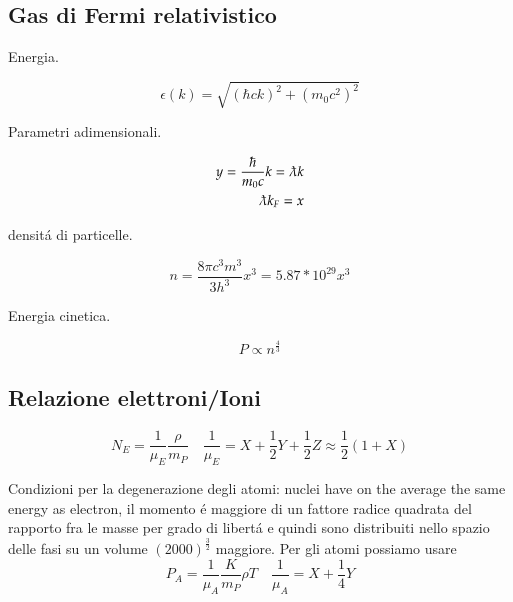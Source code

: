 \subsection{Gas di Fermi relativistico}
\begin{itemize*}

\item Energia.

\begin{equation*}
\epsilon(k)=\sqrt{(\hbar ck)^2+(m_0c^2)^2}
\end{equation*}

\item Parametri adimensionali.

\begin{align*}
y=\frac{\hbar}{m_0c}k=\lambdabar k\\
\lambdabar k_F=x
\end{align*}

\item densit\'a di particelle.

\begin{equation*}
n=\frac{8\pi c^3m^3}{3h^3}x^3=5.87*10^{29}x^3
\end{equation*}

\item Energia cinetica.

\begin{equation*}
P\propto n^{\frac{4}{3}}
\end{equation*}

\end{itemize*}

\subsection{Relazione elettroni/Ioni}
\begin{equation*}
N_E=\frac{1}{\mu_E}\frac{\rho}{m_P}\quad\frac{1}{\mu_E}=X+\frac{1}{2}Y+\frac{1}{2}Z\approx\frac{1}{2}(1+X)
\end{equation*}

Condizioni per la degenerazione degli atomi: nuclei have on the average the same energy as electron, il momento \'e maggiore di un fattore radice quadrata del rapporto fra le masse per grado di libert\'a e quindi sono distribuiti nello spazio delle fasi su un volume $(2000)^{\frac{3}{2}}$ maggiore.
Per gli atomi possiamo usare
\begin{equation*}
P_A=\frac{1}{\mu_A}\frac{K}{m_P}\rho T\quad\frac{1}{\mu_A}=X+\frac{1}{4}Y
\end{equation*}

